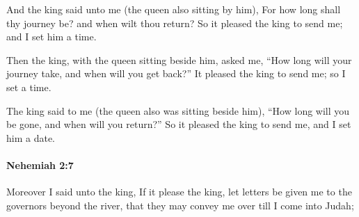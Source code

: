 			\begin{versebox}
					\item[BHS] 
					\item[LXX] 
					\item[ASV] And the king said unto me (the queen also sitting by him), For how long shall thy journey be? and when wilt thou return? So it pleased the king to send me; and I set him a time.
					\item[NIV] Then the king, with the queen sitting beside him, asked me, “How long will your journey take, and when will you get back?” It pleased the king to send me; so I set a time.
					\item[NRSV] The king said to me (the queen also was sitting beside him), “How long will you be gone, and when will you return?” So it pleased the king to send me, and I set him a date.
			\end{versebox}

		\paragraph{Nehemiah 2:7} %
			\label{NEHEMIAH-2-7}

			Moreover I said unto the king, If it please the king, let letters be given me to the governors beyond the river, that they may convey me over till I come into Judah;

